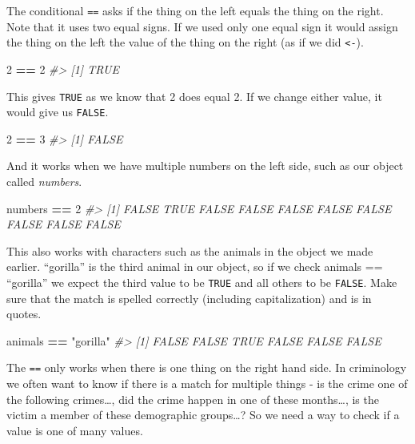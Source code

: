 \documentclass[
  12pt,
]{book}
\newenvironment{Shaded}{\begin{snugshade}}{\end{snugshade}}
\newcommand{\CommentTok}[1]{\textcolor[rgb]{0.37,0.37,0.37}{\textit{#1}}}
\newcommand{\DecValTok}[1]{\textcolor[rgb]{0.06,0.06,0.06}{#1}}
\newcommand{\NormalTok}[1]{#1}
\newcommand{\OperatorTok}[1]{\textcolor[rgb]{0.43,0.43,0.43}{\textbf{#1}}}
\newcommand{\StringTok}[1]{\textcolor[rgb]{0.5,0.5,0.5}{#1}}
\begin{document}
The conditional \texttt{==} asks if the thing on the left equals the thing on the right. Note that it uses two equal signs. If we used only one equal sign it would assign the thing on the left the value of the thing on the right (as if we did \texttt{\textless{}-}).

\begin{Shaded}
\begin{Highlighting}[]
\DecValTok{2} \OperatorTok{==}\StringTok{ }\DecValTok{2}
\CommentTok{\#> [1] TRUE}
\end{Highlighting}
\end{Shaded}

This gives \texttt{TRUE} as we know that 2 does equal 2. If we change either value, it would give us \texttt{FALSE}.

\begin{Shaded}
\begin{Highlighting}[]
\DecValTok{2} \OperatorTok{==}\StringTok{ }\DecValTok{3}
\CommentTok{\#> [1] FALSE}
\end{Highlighting}
\end{Shaded}

And it works when we have multiple numbers on the left side, such as our object called \emph{numbers}.

\begin{Shaded}
\begin{Highlighting}[]
\NormalTok{numbers }\OperatorTok{==}\StringTok{ }\DecValTok{2}
\CommentTok{\#>  [1] FALSE  TRUE FALSE FALSE FALSE FALSE FALSE FALSE FALSE FALSE}
\end{Highlighting}
\end{Shaded}

This also works with characters such as the animals in the object we made earlier. ``gorilla'' is the third animal in our object, so if we check animals == ``gorilla'' we expect the third value to be \texttt{TRUE} and all others to be \texttt{FALSE}. Make sure that the match is spelled correctly (including capitalization) and is in quotes.

\begin{Shaded}
\begin{Highlighting}[]
\NormalTok{animals }\OperatorTok{==}\StringTok{ "gorilla"}
\CommentTok{\#> [1] FALSE FALSE  TRUE FALSE FALSE FALSE}
\end{Highlighting}
\end{Shaded}

The \texttt{==} only works when there is one thing on the right hand side. In criminology we often want to know if there is a match for multiple things - is the crime one of the following crimes\ldots, did the crime happen in one of these months\ldots, is the victim a member of these demographic groups\ldots? So we need a way to check if a value is one of many values.
\end{document}
